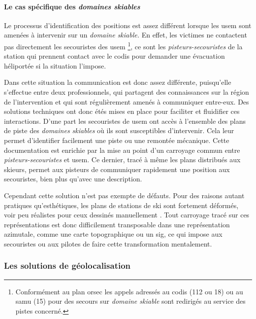 \paragraph{Le cas spécifique des \emph{domaines skiables}}

Le processus d'identification des positions est assez différent
lorsque les \ac{usem} sont amenées à intervenir sur un \emph{domaine
  skiable.} En effet, les victimes ne contactent pas directement les
secouristes des \ac{usem} \footnote{Conformément au plan \ac{orsec}
  les appels adressés au \ac{codis} (112 ou 18) ou au \ac{samu} (15)
  pour des secours sur \emph{domaine skiable} sont redirigés au
  service des pistes concerné.}, ce sont les
\emph{pisteurs-secouristes} de la station qui prennent contact avec le
\ac{codis} pour demander une évacuation héliportée si la situation
l'impose.

Dans cette situation la communication est donc assez différente,
puisqu'elle s'effectue entre deux professionnels, qui partagent des
connaissances sur la région de l'intervention et qui sont
régulièrement amenés à communiquer entre-eux. Des solutions techniques
ont donc étés mises en place pour faciliter et fluidifier ces
interactions. D'une part les secouristes de \ac{usem} ont accès à
l'ensemble des plans de piste des \emph{domaines skiables} où ils sont
susceptibles d'intervenir. Cela leur permet d'identifier facilement
une piste ou une remontée mécanique. Cette documentation est enrichie
par la mise au point d'un carroyage commun entre
\emph{pisteurs-secouristes} et \ac{usem}. Ce dernier, tracé à même les
plans distribués aux skieurs, permet aux pisteurs de communiquer
rapidement une position aux secouristes, bien plus qu'avec une
description.

Cependant cette solution n'est pas exempte de défauts. Pour des
raisons autant pratiques qu’esthétiques, les plans de stations de ski
sont fortement déformés, voir peu réalistes pour ceux dessinés
manuellement \autocite{Gauchon2014,LaPorte2017}. Tout carroyage tracé
sur ces représentations est donc difficilement transposable dans une
représentation azimutale, comme une carte topographique ou un
\ac{sig}, ce qui impose aux secouristes ou aux pilotes de faire cette
transformation mentalement.

\subsubsection{Les solutions de géolocalisation}
\label{subsec:1-1-2-2}


